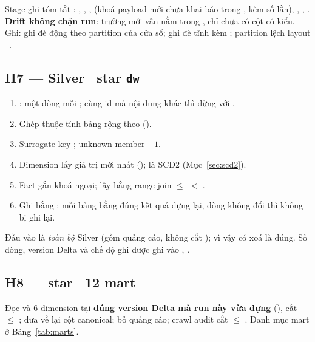 Stage ghi tóm tắt : , , ,
 (khoá payload mới chưa khai báo trong , kèm số lần), , ,
. \textbf{Drift không chặn run}: trường mới vẫn nằm trong , chỉ chưa có cột có kiểu.
Ghi: ghi đè động theo partition của cửa sổ;  ghi đè tĩnh kèm ; partition lệch layout \ra\ .

\subsection{H7 — Silver \ra\ star \texttt{dw}}
\begin{enumerate}
  \item {}: một dòng mỗi ; cùng id mà nội dung khác thì dừng với .
  \item Ghép thuộc tính bảng rộng theo  ().
  \item Surrogate key ; unknown member $-1$.
  \item Dimension lấy giá trị mới nhất ();  là SCD2 (Mục~\ref{sec:scd2}).
  \item Fact gắn khoá ngoại;  lấy bằng range join  $\le$  $<$ .
  \item Ghi bằng :
        mỗi bảng bằng đúng kết quả dựng lại, dòng không đổi thì không bị ghi lại.
\end{enumerate}
Đầu vào là \emph{toàn bộ} Silver (gồm quảng cáo, không cắt ); vì vậy  có xoá là đúng. Số dòng, version Delta và chế độ ghi
được ghi vào , .

\subsection{H8 — star \ra\ 12 mart}
Đọc  và 6 dimension tại \textbf{đúng version Delta mà run này vừa dựng} (), cắt
 $\le$ ;  đưa về lại cột canonical;  bỏ quảng cáo;
crawl audit cắt  $\le$ . Danh mục mart ở Bảng~\ref{tab:marts}.


